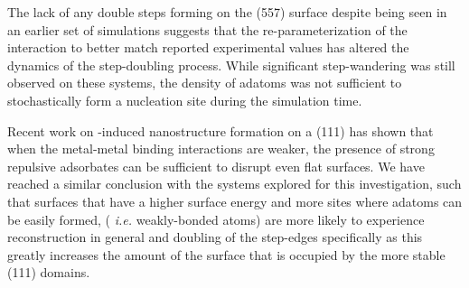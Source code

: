 The lack of any double steps forming on the (557) surface despite being seen in
an earlier set of simulations suggests that the re-parameterization of the
 interaction to better match reported experimental values has
altered the dynamics of the step-doubling process.  While significant
step-wandering was still observed on these systems, the density of adatoms was
not sufficient to stochastically form a nucleation site during the simulation
time.

Recent work on -induced nanostructure formation on a  (111) has
shown that when the metal-metal binding interactions are weaker, the presence
of strong repulsive adsorbates can be sufficient to disrupt even flat
surfaces.\citep{Eren:2016qt} We have reached a similar conclusion with the
 systems explored for this investigation, such that surfaces that have a
higher surface energy and more sites where adatoms can be easily formed, ({\em
i.e.} weakly-bonded atoms) are more likely to experience reconstruction in
general and doubling of the step-edges specifically as this greatly increases
the amount of the surface that is occupied by the more stable (111) domains.

